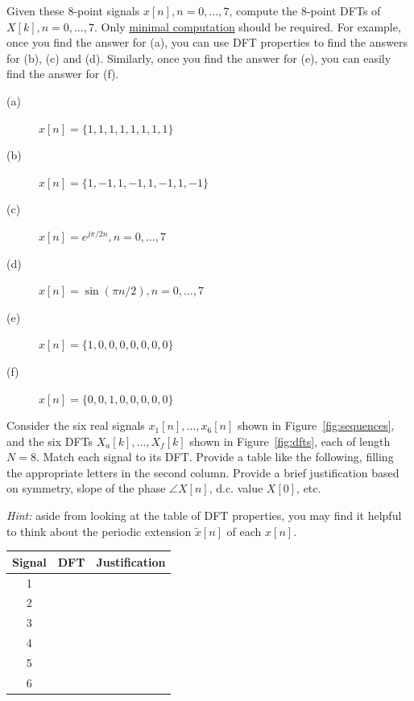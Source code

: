 \documentclass[12pt]{report}
\begin{document}

Given these 8-point signals $x[n], n = 0, \ldots, 7$, compute the 8-point DFTs of $X[k], n = 0, \ldots, 7$. Only \underline{minimal computation} should be required. For example, once you find the answer for (a), you can use DFT properties to find the answers for (b), (c) and (d). Similarly, once you find the answer for (e), you can easily find the answer for (f).

\begin{description}
	\item [(a)] $x[n] = \{1, 1, 1, 1, 1, 1, 1, 1\}$
	\item [(b)] $x[n] = \{1, -1, 1, -1, 1, -1, 1, -1\}$
	\item [(c)] $x[n] = e^{j\pi/2 n}, n = 0, \ldots, 7$
	\item [(d)] $x[n] = \sin(\pi n/2), n = 0, \ldots, 7$
	\item [(e)] $x[n] = \{1, 0, 0, 0, 0, 0, 0, 0\}$
	\item [(f)] $x[n] = \{0, 0, 1, 0, 0, 0, 0, 0\}$
\end{description}

\newpage
{} 

Consider the six real signals $x_1[n], \ldots, x_6[n]$ shown in Figure~\ref{fig:sequences}, and the six DFTs $X_a[k], \ldots, X_f[k]$ shown in Figure~\ref{fig:dfts}, each of length $N = 8$. Match each signal to its DFT. Provide a table like the following, filling the appropriate letters in the second column. Provide a brief justification based on symmetry, slope of the phase  $\angle X[n]$, d.c. value $X[0]$, etc. 

\noindent\textit{Hint:} aside from looking at the table of DFT properties, you may find it helpful to think about the periodic extension $\tilde{x}[n]$ of each $x[n]$.


\begin{center}
	\begin{tabular}{c|c|p{10cm}}
	Signal & DFT & Justification \\
	\hline
	1 & & \\
	2 & & \\
	3 & & \\
	4 & & \\
	5 & & \\
	6 & & \\
	\hline
\end{tabular}
\end{center}
\end{document}
